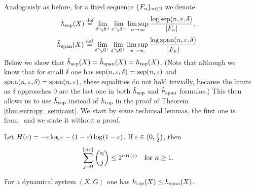 Analogously as before, for a fixed \Folner sequence $\{F_n\}_{n\in\mathbb{N}}$ we denote 
\begin{equation}\label{eq:dhsep}
\tilde{h}_{\mathrm{sep}}(X)\stackrel{\textup{def}}{=}\lim\limits_{\delta\searrow 0^+}\lim\limits_{\varepsilon\searrow 0^+}\limsup\limits_{n\to\infty}\frac{\log \operatorname{sep}(n,\varepsilon, \delta)}{|F_n|},
\end{equation}
\begin{equation}\label{eq:dhspn}
\tilde{h}_{\mathrm{span}}(X)\stackrel{\textup{def}}{=}\lim\limits_{\delta\searrow 0^+}\lim\limits_{\varepsilon\searrow 0^+}\limsup\limits_{n\to\infty}\frac{\log \operatorname{span}(n,\varepsilon, \delta)}{|F_n|}.
\end{equation}
Below we show that $\tilde{h}_{\mathrm{sep}}(X)=\tilde{h}_{\mathrm{span}}(X)=h_\mathrm{top}(X)$. (Note that although we know that for small $\delta$ one has  $\operatorname{sep}(n,\varepsilon,\delta)=\operatorname{sep}(n,\varepsilon)$ and $\operatorname{span}(n,\varepsilon,\delta)=\operatorname{span}(n,\varepsilon)$, these equalities do not hold trivially, because the limits as $\delta$ approaches $0$ are the last one in both $\tilde{h}_{\mathrm{sep}}$ and $\tilde{h}_{\mathrm{span}}$ formulas.)
%
This then allows us to use $\tilde{h}_{\mathrm{sep}}$ instead of $h_\mathrm{top}$ in the proof of Theorem \ref{thm:entropy_semicont}.
%
We start by some technical lemmas, the first one is from~\cite{Shields96} and we state it without a proof.
\begin{lem}\label{newtSumEstim}
Let $H(\varepsilon)=-\varepsilon\log \varepsilon - (1-\varepsilon)\log (1-\varepsilon)$. If $\varepsilon\in(0,\frac{1}{2})$, then
\[
\sum_{j=0}^{\lfloor n \varepsilon \rfloor}{\binom{n}{j}}\le 2^{nH(\varepsilon)} \quad\text{for $n\ge 1$}.
\]
\end{lem}
\noindent


\begin{lem}\label{hUpEstim}
For a dynamical system $(X,G)$ one has  $h_\mathrm{top}(X)\leq \tilde{h}_{\mathrm{span}}(X)$.
\end{lem}

